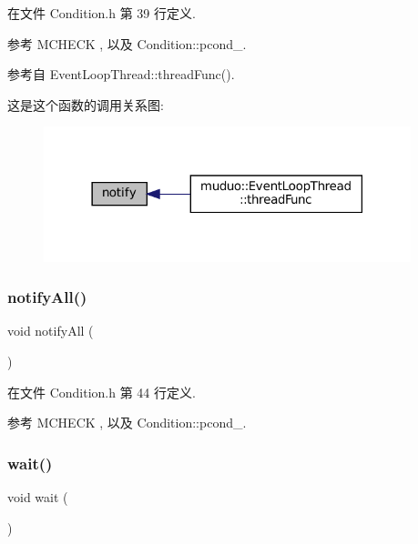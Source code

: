 在文件 Condition.\+h 第 39 行定义.



参考 M\+C\+H\+E\+CK , 以及 Condition\+::pcond\+\_\+.



参考自 Event\+Loop\+Thread\+::thread\+Func().

这是这个函数的调用关系图\+:
\nopagebreak
\begin{figure}[H]
\begin{center}
\leavevmode
\includegraphics[width=302pt]{classmuduo_1_1Condition_a7ff19734eb024bd6f3e2ad95647b1b27_icgraph}
\end{center}
\end{figure}
\mbox{\label{classmuduo_1_1Condition_ae01f53e9933a1e6e4742d8d889ead690}} 
\subsubsection{\texorpdfstring{notify\+All()}{notifyAll()}}
{\footnotesize\ttfamily void notify\+All (\begin{DoxyParamCaption}{ }\end{DoxyParamCaption})\hspace{0.3cm}{\ttfamily [inline]}}



在文件 Condition.\+h 第 44 行定义.



参考 M\+C\+H\+E\+CK , 以及 Condition\+::pcond\+\_\+.

\mbox{\label{classmuduo_1_1Condition_aa3b21853f890838c88d047d6c2786917}} 
\subsubsection{\texorpdfstring{wait()}{wait()}}
{\footnotesize\ttfamily void wait (\begin{DoxyParamCaption}{ }\end{DoxyParamCaption})\hspace{0.3cm}{\ttfamily [inline]}}



